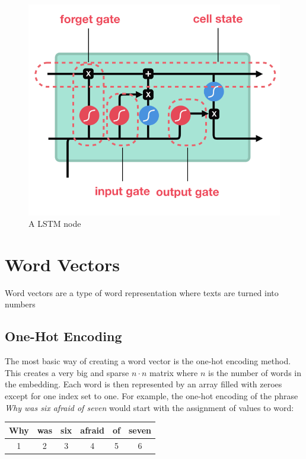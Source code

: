 \documentclass[nofilelist]{cslthse-msc}
\begin{document}
\begin{figure}[h!]
    \centering
    \includegraphics[scale=0.4]{msccls/explanatory_images/lstm.png}
    \caption{A LSTM node}
    \label{fig:lstm_node}
\end{figure}


\section{Word Vectors}
Word vectors are a type of word representation where texts are turned into numbers
\subsection{One-Hot Encoding}
The most basic way of creating a word vector is the one-hot encoding method. This creates a very big and sparse $n \cdot n$ matrix where $n$ is the number of words in the embedding. Each word is then represented by an array filled with zeroes except for one index set to one. For example, the one-hot encoding of the phrase \textit{Why was six afraid of seven} would start with the assignment of values to word:

\begin{center}
    \begin{tabular}{c|c|c|c|c|c}
    
         Why & was & six & afraid & of & seven \\
         \hline
         1 & 2 & 3 & 4 & 5 & 6 \\
    \end{tabular}
\end{center}
\end{document}
